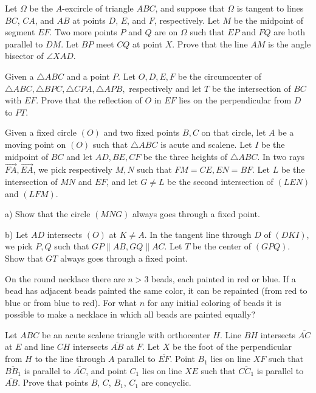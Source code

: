 \documentclass[11pt]{scrartcl}
\begin{document}
\begin{problem}[6566259136811987209]
	Let $\Omega$ be the $A$-excircle of triangle $ABC$, and suppose that $\Omega$ is tangent to lines $BC$, $CA$, and $AB$ at points $D$, $E$, and $F$, respectively. Let $M$ be the midpoint of segment $EF$. Two more points $P$ and $Q$ are on $\Omega$ such that $EP$ and $FQ$ are both parallel to $DM$. Let $BP$ meet $CQ$ at point $X$. Prove that the line $AM$ is the angle bisector of $\angle XAD$.
\end{problem}
\begin{problem}[8569243655022492300]
	Given a $ \triangle ABC $ and a point $ P. $ Let $ O, D, E, F $ be the circumcenter of $ \triangle ABC, \triangle BPC, \triangle CPA, \triangle APB, $ respectively and let $ T $ be the intersection of $ BC $ with $ EF. $ Prove that the reflection of $ O $ in $ EF $ lies on the perpendicular from $ D $ to $ PT. $
\end{problem}
\begin{problem}[5990443173263547430]
	Given a fixed circle $(O)$ and two fixed points $B, C$ on that circle, let $A$ be a moving point on $(O)$ such that $\triangle ABC$ is acute and scalene. Let $I$ be the midpoint of $BC$ and let $AD, BE, CF$ be the three heights of $\triangle ABC$. In two rays $\overrightarrow{FA}, \overrightarrow{EA}$, we pick respectively $M,N$ such that $FM = CE, EN = BF$. Let $L$ be the intersection of $MN$ and $EF$, and let $G \neq L$ be the second intersection of $(LEN)$ and $(LFM)$.

a) Show that the circle $(MNG)$ always goes through a fixed point.

b) Let $AD$ intersects $(O)$ at $K \neq A$. In the tangent line through $D$ of $(DKI)$, we pick $P,Q$ such that $GP \parallel AB, GQ \parallel AC$. Let $T$ be the center of $(GPQ)$. Show that $GT$ always goes through a fixed point.
\end{problem}
\begin{problem}[6975633259976638169]
On the round necklace there are $n> 3$ beads, each painted in red or blue. If a bead has adjacent beads painted the same color, it can be repainted (from red to blue or from blue to red). For what $n$ for any initial coloring of beads it is possible to make a necklace in which all beads are painted equally?
\end{problem}
\begin{problem}[15595788767204175]
Let \(ABC\) be an acute scalene triangle with orthocenter \(H\). Line \(BH\) intersects \(\overline{AC}\) at \(E\) and line \(CH\) intersects \(\overline{AB}\) at \(F\). Let \(X\) be the foot of the perpendicular from \(H\) to the line through \(A\) parallel to \(\overline{EF}\). Point \(B_1\) lies on line \(XF\) such that \(\overline{BB_1}\) is parallel to \(\overline{AC}\), and point \(C_1\) lies on line \(XE\) such that \(\overline{CC_1}\) is parallel to \(\overline{AB}\). Prove that points \(B\), \(C\), \(B_1\), \(C_1\) are concyclic.
\end{problem}
\end{document}
